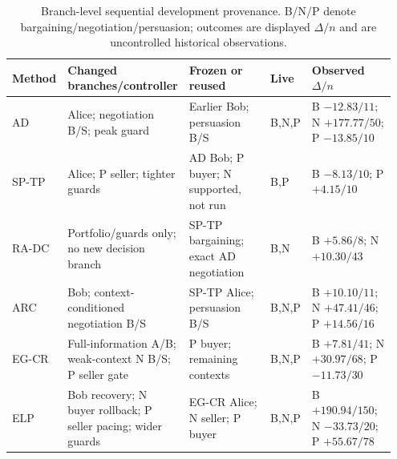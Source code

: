 \begin{table}[t]
\centering
\footnotesize
\setlength{\tabcolsep}{2pt}
\caption{Branch-level sequential development provenance. B/N/P denote bargaining/negotiation/persuasion; outcomes are displayed $\Delta/n$ and are uncontrolled historical observations.}
\label{tab:method-lineage}
\begin{tabular}{@{}p{0.08\linewidth}p{0.27\linewidth}p{0.27\linewidth}p{0.07\linewidth}p{0.26\linewidth}@{}}
\toprule
Method & Changed branches/controller & Frozen or reused & Live & Observed $\Delta/n$ \\
\midrule
AD & Alice; negotiation B/S; peak guard & Earlier Bob; persuasion B/S & B,N,P & B $-12.83/11$; N $+177.77/50$; P $-13.85/10$ \\
SP-TP & Alice; P seller; tighter guards & AD Bob; P buyer; N supported, not run & B,P & B $-8.13/10$; P $+4.15/10$ \\
RA-DC & Portfolio/guards only; no new decision branch & SP-TP bargaining; exact AD negotiation & B,N & B $+5.86/8$; N $+10.30/43$ \\
ARC & Bob; context-conditioned negotiation B/S & SP-TP Alice; persuasion B/S & B,N,P & B $+10.10/11$; N $+47.41/46$; P $+14.56/16$ \\
EG-CR & Full-information A/B; weak-context N B/S; P seller gate & P buyer; remaining contexts & B,N,P & B $+7.81/41$; N $+30.97/68$; P $-11.73/30$ \\
ELP & Bob recovery; N buyer rollback; P seller pacing; wider guards & EG-CR Alice; N seller; P buyer & B,N,P & B $+190.94/150$; N $-33.73/20$; P $+55.67/78$ \\
\bottomrule
\end{tabular}
\end{table}
